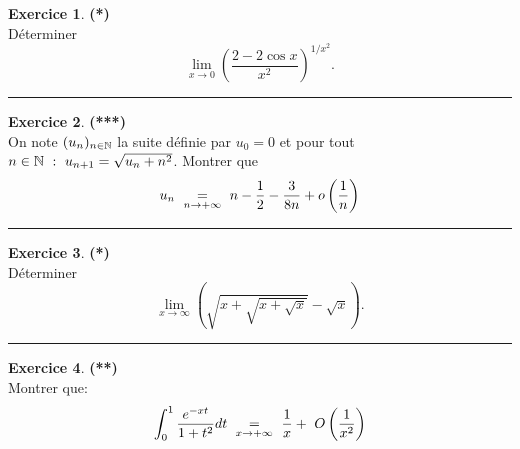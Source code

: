 \documentclass[a4paper,11pt]{article}
\theoremstyle{definition}
\newtheorem{exo}{Exercice} %
\begin{document}
\begin{exo}\textbf{(*)}\quad\\[0.25cm]%
Déterminer
\[
\lim_{x \to 0} \left(\frac{2 - 2\cos x}{x^2}\right)^{1/x^2}.
\]

	\centering
\rule{1\linewidth}{0.6pt}
\end{exo}



\begin{exo}\textbf{(***)}\quad\\[0.25cm]
On note $(u_n)_{n\in\mathbb{N}}$ la suite définie par $u_0 = 0$ et pour tout $n \in \mathbb{N} \ : \  u_{n+1}= \sqrt{u_n + n^2 }$. Montrer que
$$u_n  \ \underset{\small n\rightarrow+\infty}{=} \ n - \dfrac{1}{2} -\dfrac{3}{8n} + o\left(\dfrac{1}{n}\right)
$$ 	
	\centering
	\rule{1\linewidth}{0.6pt}
\end{exo}


\begin{exo}\textbf{(*)}\quad\\[0.25cm]%
	 Déterminer
	\[
	\lim_{x \to \infty} \left(\sqrt{x + \sqrt{x + \sqrt x}} -
	\sqrt{x}\right).
	\]

	\centering
	\rule{1\linewidth}{0.6pt}
\end{exo}


\begin{exo}\textbf{(**)}\quad\\[0.25cm]
		Montrer que:
	$$\int_{0}^{1}\dfrac{e^{-xt}}{1+t^2}dt  \ \underset{\small x\rightarrow+\infty}{=} \ \dfrac{1}{x} + \ O\left(\dfrac{1}{x^2}\right)
	$$
\end{exo}
\end{document}
